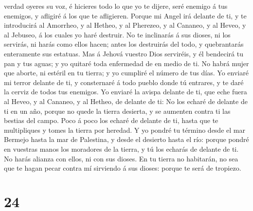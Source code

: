 verdad oyeres su voz, é hicieres todo lo que yo te dijere, seré enemigo
á tus enemigos, y afligiré á los que te afligieren.  Porque
mi Angel irá delante de ti, y te introducirá al Amorrheo, y al Hetheo, y
al Pherezeo, y al Cananeo, y al Heveo, y al Jebuseo, á los cuales yo
haré destruir.  No te inclinarás á sus dioses, ni los
servirás, ni harás como ellos hacen; antes los destruirás del todo, y
quebrantarás enteramente sus estatuas.  Mas á Jehová
vuestro Dios serviréis, y él bendecirá tu pan y tus aguas; y yo quitaré
toda enfermedad de en medio de ti.  No habrá mujer que
aborte, ni estéril en tu tierra; y yo cumpliré el número de tus días.
 Yo enviaré mi terror delante de ti, y consternaré á todo
pueblo donde tú entrares, y te daré la cerviz de todos tus enemigos.
 Yo enviaré la avispa delante de ti, que eche fuera al
Heveo, y al Cananeo, y al Hetheo, de delante de ti:  No los
echaré de delante de ti en un año, porque no quede la tierra desierta, y
se aumenten contra ti las bestias del campo.  Poco á poco
los echaré de delante de ti, hasta que te multipliques y tomes la tierra
por heredad.  Y yo pondré tu término desde el mar Bermejo
hasta la mar de Palestina, y desde el desierto hasta el río: porque
pondré en vuestras manos los moradores de la tierra, y tú los echarás de
delante de ti.  No harás alianza con ellos, ni con sus
dioses.  En tu tierra no habitarán, no sea que te hagan
pecar contra mí sirviendo á sus dioses: porque te será de tropiezo.

\hypertarget{section-23}{%
\section{24}\label{section-23}}


